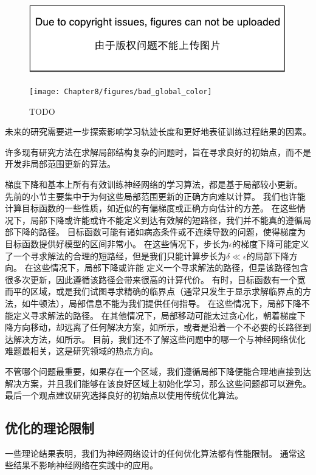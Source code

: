 \begin{figure}[!htb]
\ifOpenSource
\centerline{\includegraphics{figure.pdf}}
\else
\centerline{\texttt{[image: Chapter8/figures/bad\_global\_color]}}
\fi
\caption{TODO}
\label{fig:chap8_bad_global}
\end{figure}



未来的研究需要进一步探索影响学习轨迹长度和更好地表征训练过程结果的因素。

许多现有研究方法在求解局部结构复杂的问题时，旨在寻求良好的初始点，而不是开发非局部范围更新的算法。

梯度下降和基本上所有有效训练神经网络的学习算法，都是基于局部较小更新。
先前的小节主要集中于为何这些局部范围更新的正确方向难以计算。
我们也许能计算目标函数的一些性质，如近似的有偏梯度或正确方向估计的方差。
在这些情况下，局部下降或许能或许不能定义到达有效解的短路径，我们并不能真的遵循局部下降的路径。
目标函数可能有诸如病态条件或不连续导数的问题，使得梯度为目标函数提供好模型的区间非常小。
在这些情况下，步长为$\epsilon$的梯度下降可能定义了一个寻求解法的合理的短路经，但是我们只能计算步长为$\delta \ll \epsilon$的局部下降方向。
在这些情况下，局部下降或许能 定义一个寻求解法的路径，但是该路径包含很多次更新，因此遵循该路径会带来很高的计算代价。
有时，目标函数有一个宽而平的区域，或是我们试图寻求精确的临界点（通常只发生于显示求解临界点的方法，如牛顿法），局部信息不能为我们提供任何指导。
在这些情况下，局部下降不能定义寻求解法的路径。
在其他情况下，局部移动可能太过贪心化，朝着梯度下降方向移动，却远离了任何解决方案，如所示，或者是沿着一个不必要的长路径到达解决方法，如所示。
目前，我们还不了解这些问题中的哪一个与神经网络优化难题最相关，这是研究领域的热点方向。


不管哪个问题最重要，如果存在一个区域，我们遵循局部下降便能合理地直接到达解决方案，并且我们能够在该良好区域上初始化学习，那么这些问题都可以避免。
最后一个观点建议研究选择良好的初始点以使用传统优化算法。

\subsection{优化的理论限制}
\label{sec:theoretical_limits_of_optimization}
一些理论结果表明，我们为神经网络设计的任何优化算法都有性能限制\citep{Blum92,JuddBook,wolpert96no}。
通常这些结果不影响神经网络在实践中的应用。

